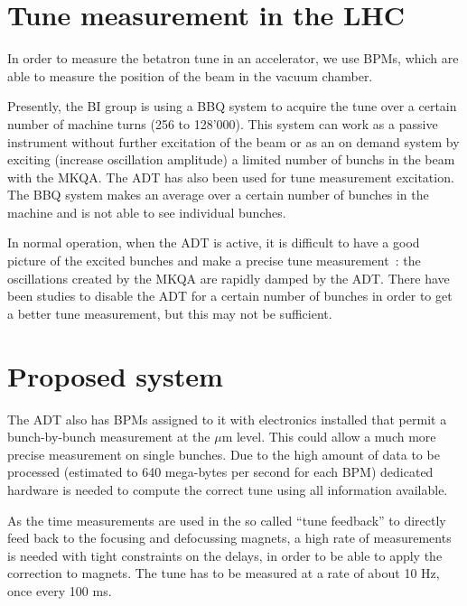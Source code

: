 \section{Tune measurement in the LHC}

In order to measure the betatron tune in an accelerator, we use
\glspl{BPM}, which are able to measure the position of the beam in the
vacuum chamber.

Presently, the \gls{BI} group is using a \gls{BBQ} \cite{Boccardi:1156349} system to acquire the tune over a certain number of machine turns (256 to 128'000). This system can work as a passive instrument without further excitation of the beam or as an on demand system by exciting (increase oscillation amplitude) a limited number of \glspl{bunch} in the beam with the \gls{MKQA}. The \Gls{ADT} has also been used for tune measurement excitation\cite{HofleEvian10}. The \gls{BBQ} system makes an average over a certain number of bunches in the machine and is not able to see individual bunches.

In normal operation, when the \gls{ADT} is active, it is difficult to have a good picture of the excited bunches and make a precise tune measurement~: the oscillations created by the \gls{MKQA} are rapidly damped by the \gls{ADT}. There have been studies to disable the \gls{ADT} for a certain number of bunches in order to get a better tune measurement\cite{HofleEvian11}, but this may not be sufficient.

\section{Proposed system}

The \gls{ADT} also has \glspl{BPM} assigned to it with electronics installed that permit a bunch-by-bunch measurement at the $\mu$m level\cite{BphMeas07}. This could allow a much more precise measurement on single bunches. Due to the high amount of data to be processed (estimated to 640 mega-bytes per second for each \gls{BPM}) dedicated hardware is needed to compute the correct tune using all information available\cite{HofleChamonix12}.

As the time measurements are used in the so called ``tune feedback''
to directly feed back to the focusing and defocussing magnets, a high
rate of measurements is needed with tight constraints on the delays,
in order to be able to apply the correction to magnets. The \gls{tune}
has to be measured at a rate of about 10 Hz, once every 100 ms.

